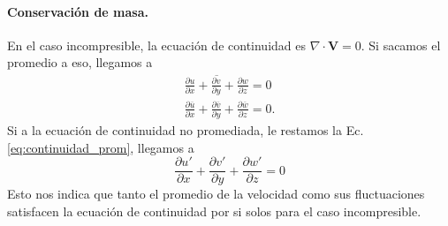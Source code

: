 \paragraph*{Conservación de masa.}
En el caso incompresible, la ecuación de continuidad es $\nabla\cdot\mathbf{V}=0$.
Si sacamos el promedio a eso, llegamos a
%
\begin{align}\label{eq:continuidad_prom}
\overline{\frac{\partial u}{\partial x} + \frac{\partial v}{\partial y} + \frac{\partial w}{\partial z}} = 0\nonumber\\
\frac{\partial \overline{u}}{\partial x} + \frac{\partial \overline{v}}{\partial y} + \frac{\partial \overline{w}}{\partial z} = 0.
\end{align}
%
Si a la ecuación de continuidad no promediada, le restamos la Ec. \eqref{eq:continuidad_prom}, llegamos a
%
\begin{equation}\label{eq:continuidad_fluc}
\frac{\partial u'}{\partial x} + \frac{\partial v'}{\partial y} + \frac{\partial w'}{\partial z} = 0
\end{equation}
%
Esto nos indica que tanto el promedio de la velocidad como sus fluctuaciones satisfacen la ecuación de continuidad por si solos para el caso incompresible.

